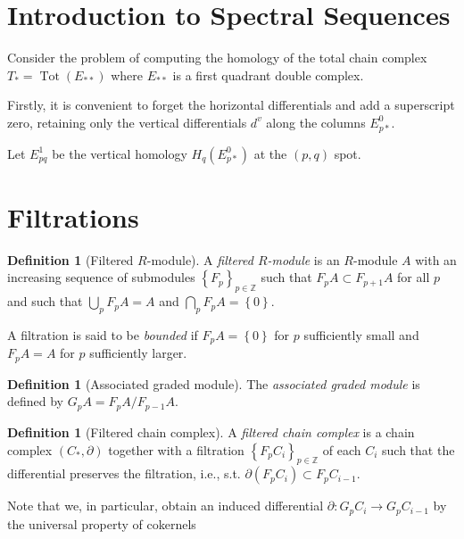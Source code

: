 \documentclass[reqno]{amsart}
\theoremstyle{definition}
\newtheorem{definition}[theorem]{Definition}
\theoremstyle{remark}
\DeclareMathOperator{\Tot}{Tot}
\begin{document}
\newpage
\section{Introduction to Spectral Sequences}

Consider the problem of computing the homology
of the total chain complex
$T_* = \Tot(E_{* * })$ where
$E_{* *}$ is a first quadrant double complex.

Firstly, it is convenient to forget the horizontal differentials
and add a superscript zero, retaining only the vertical
differentials $d^{v}$ along the columns
$E_{p*}^{0}$.

Let $E_{pq}^{1}$ be the vertical homology
$H_q \left( E_{p*}^{0} \right) $ at the
$(p,q)$ spot.





\section{Filtrations}

\begin{definition}[Filtered $R$-module]
    A \textit{filtered $R$-module} is an $R$-module
    $A$ with an increasing sequence
    of submodules 
    $\left\{ F_p \right\}_{p \in \mathbb{Z}}$ 
    such that $F_p A \subset F_{p+1}A$ for all
    $p$ and such that
    $\bigcup_{p} F_pA = A$ and
    $\bigcap_{p} F_p A = \left\{ 0 \right\} $.

    A filtration is said to be \textit{bounded} if
    $F_p A = \left\{ 0 \right\} $ for
    $p$ sufficiently small and
    $F_p A = A$ for $p$ sufficiently larger.
\end{definition}

\begin{definition}[Associated graded module]
    The \textit{associated graded module} is defined
    by $G_p A = F_p A / F_{p-1} A$.
\end{definition}

\begin{definition}[Filtered chain complex]
    A \textit{filtered chain complex} is a chain
    complex $\left( C_*, \partial \right) $ together
    with a filtration $\left\{ F_p C_i \right\}_{p \in \mathbb{Z}}$ 
    of each $C_i$ such that the differential preserves
    the filtration, i.e., s.t. 
    $\partial \left( F_p C_i \right) \subset F_p C_{i-1}$.
\end{definition}

Note that we, in particular, obtain an
induced differential
$\partial \colon G_p C_i \to G_{p} C_{i-1}$ by
the universal property of cokernels
\end{document}
